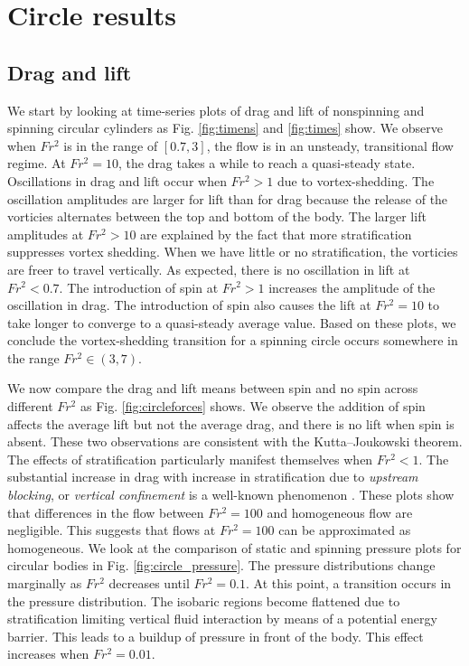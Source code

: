 \section{Circle results}
\label{section:Circle_results}
\subsection{Drag and lift}
We start by looking at time-series plots of drag and lift of nonspinning and spinning circular cylinders as Fig. \ref{fig:timens} and \ref{fig:times} show. We observe when $Fr^2$ is in the range of $[0.7, 3]$, the flow is in an unsteady, transitional flow regime. At $Fr^2 = 10$, the drag takes a while to reach a quasi-steady state. Oscillations in drag and lift occur when $Fr^2 > 1$ due to vortex-shedding. The oscillation amplitudes are larger for lift than for drag because the release of the vorticies alternates between the top and bottom of the body. The larger lift amplitudes at $Fr^2 > 10$ are explained by the fact that more stratification suppresses vortex shedding. When we have little or no stratification, the vorticies are freer to travel vertically. As expected, there is no oscillation in lift at $Fr^2 < 0.7$. The introduction of spin at $Fr^2 > 1$ increases the amplitude of the oscillation in drag. The introduction of spin also causes the lift at $Fr^2 = 10$ to take longer to converge to a quasi-steady average value. Based on these plots, we conclude the vortex-shedding transition for a spinning circle occurs somewhere in the range $Fr^2 \in (3,7)$. 

We now compare the drag and lift means between spin and no spin across different $Fr^2$ as Fig. \ref{fig:circleforces} shows. We observe the addition of spin affects the average lift but not the average drag, and there is no lift when spin is absent. These two observations are consistent with the Kutta–Joukowski theorem. The effects of stratification particularly manifest themselves when $Fr^2 < 1$. The substantial increase in drag with increase in stratification due to \textit{upstream blocking}, or \textit{vertical confinement} is a well-known phenomenon \cite{deng_drag_2022, ortiz-tarin_stratified_2019}. These plots show that differences in the flow between $Fr^2 = 100$ and homogeneous flow are negligible. This suggests that flows at $Fr^2 = 100$ can be approximated as homogeneous. We look at the comparison of static and spinning pressure plots for circular bodies in Fig. \ref{fig:circle_pressure}. The pressure distributions change marginally as $Fr^2$ decreases until $Fr^2 = 0.1$. At this point, a transition occurs in the pressure distribution. The isobaric regions become flattened due to stratification limiting vertical fluid interaction by means of a potential energy barrier. This leads to a buildup of pressure in front of the body. This effect increases when $Fr^2 = 0.01$. 

